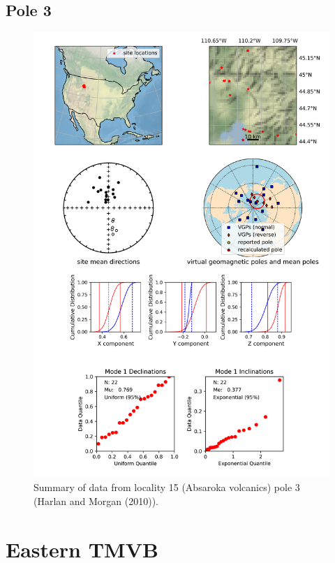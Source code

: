 \documentclass{article}
\begin{document}
\subsection{Pole 3}


\begin{figure}[H]
\centering
\includegraphics[width=5 in]{./15/3/pole_summary.png}
\caption{Summary of data from locality 15 (Absaroka volcanics) pole 3 (Harlan and Morgan (2010)).}
\end{figure}

\section{Eastern TMVB}
\end{document}

